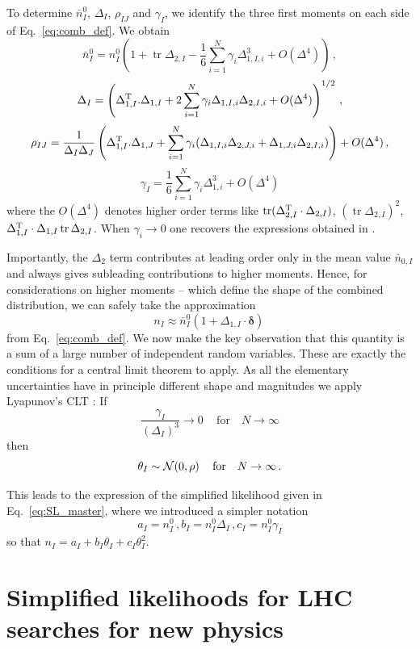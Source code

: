 \documentclass[11pt]{article}
\newcommand{\be}{\begin{equation}}
\newcommand{\ee}{\end{equation}}
\newcommand{\tr}{\operatorname{tr}}
\begin{document}
To determine $\bar{n}^{0}_{I}$, $\Delta_{I}$, $\rho_{IJ}$ and $\gamma_I$, we identify the three first moments on each side of Eq.~\eqref{eq:comb_def}. We obtain
\be
\bar{n}^{0}_{I}=n^{0}_{I}\left(
1+\tr \Delta_{2,I}-\frac{1}{6}\sum_{i=1}^N \gamma_i\Delta_{1,I,i}^3+O(\Delta^4) \right) \label{eq:n_comb}
\,,
\ee
\be
\Delta_{I}=\left(\Delta_{1,I}^{\rm T}.\Delta_{1,I}  +2\sum_{i=1}^N \gamma_i\Delta_{1,I,i}\Delta_{2,I,i}+O(\Delta^4)\right)^{1/2}\,,
\ee
\be
\rho_{IJ}= \frac{1}{\Delta_I \Delta_J}\left(\Delta_{1,I}^{\rm T}.\Delta_{1,J}  +\sum_{i=1}^N \gamma_i(\Delta_{1,I,i}\Delta_{2,J,i}+\Delta_{1,J,i}\Delta_{2,I,i})\right)+O(\Delta^4)
\,,
\ee
\be
\gamma_I=\frac{1}{6}\sum_{i=1}^N \gamma_i\Delta_{1,i}^3+O(\Delta^4) \label{eq:gam_comb}
\ee
where the $O(\Delta^4)$ denotes higher order terms like $\tr(\Delta_{2,I}^{\rm T}\cdot\Delta_{2,I})$, $(\tr\Delta_{2,I})^2$, $\Delta_{1,I}^{\rm T}\cdot\Delta_{1,I}\tr\Delta_{2,I}$.
When $\gamma_i\rightarrow 0$  one recovers the expressions obtained in \cite{Fichet:2016gvx}.


Importantly,    the $\Delta_2$ term contributes at leading order only in the mean value $\bar n_{0,I}$ and always gives subleading contributions to higher moments.
 Hence, for considerations on higher moments -- which define the  shape of the combined distribution, we can safely take the approximation
\be
n_{I}\approx \bar{n}^{0}_{I}\left(1+ \Delta_{1,I}\cdot \boldsymbol{\delta}\right)\, \label{eq:n_approx}
\ee
from Eq.~\eqref{eq:comb_def}.
We now make  the key observation that this quantity is a sum of a large number of independent random variables. These are exactly the conditions for a central limit theorem to apply.
As all the elementary uncertainties have in principle different shape and magnitudes we apply Lyapunov's CLT \cite{Billingsley}: If
\be
\frac{\gamma_I}{(\Delta_I)^3}\rightarrow 0 \quad \,\textrm{for} \quad N\rightarrow \infty
\ee
then
\be
\theta_I\sim {\cal N }(0,\rho) \quad \,\textrm{for} \quad N\rightarrow \infty \,.
\ee


This leads to the expression of the simplified likelihood given in Eq.~\eqref{eq:SL_master}, where we  introduced a simpler notation
\be
a_I=n^{0}_{I}\,, b_I=n^{0}_{I}\Delta_{I}\,, c_I = n^{0}_{I}\gamma_{I}
\ee
so that  $n_I= a_I+b_I \theta_I+c_I \theta_I^2$.


\section{Simplified likelihoods for LHC searches for new physics}
\label{se:SL_LHC}
\end{document}
